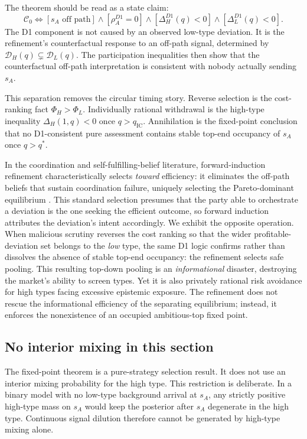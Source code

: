 The theorem should be read as a state claim:
\[
\mathcal C_0
\Longleftrightarrow
\left[
s_A\text{ off path}
\right]
\wedge
\left[
\rho_A^{D1}=0
\right]
\wedge
\left[
\Delta_H^{D1}(q)<0
\right]
\wedge
\left[
\Delta_L^{D1}(q)<0
\right].
\]
The D1 component is not caused by an observed low-type deviation. It is the refinement's counterfactual response to an off-path signal, determined by \(\mathcal D_H(q)\subsetneq\mathcal D_L(q)\). The participation inequalities then show that the counterfactual off-path interpretation is consistent with nobody actually sending \(s_A\).

This separation removes the circular timing story. Reverse selection is the cost-ranking fact \(\Phi_H>\Phi_L\). Individually rational withdrawal is the high-type inequality \(\Delta_H(1,q)<0\) once \(q>q_{\mathrm{IC}}\). Annihilation is the fixed-point conclusion that no D1-consistent pure assessment contains stable top-end occupancy of \(s_A\) once \(q>q^*\).

In the coordination and self-fulfilling-belief literature, forward-induction refinement characteristically selects \emph{toward} efficiency: it eliminates the off-path beliefs that sustain coordination failure, uniquely selecting the Pareto-dominant equilibrium \citep[e.g., the refinement resolutions of][]{diamond1983bank}. This standard selection presumes that the party able to orchestrate a deviation is the one seeking the efficient outcome, so forward induction attributes the deviation's intent accordingly. We exhibit the opposite operation. When malicious scrutiny reverses the cost ranking so that the wider profitable-deviation set belongs to the \emph{low} type, the same D1 logic confirms rather than dissolves the absence of stable top-end occupancy: the refinement selects safe pooling. This resulting top-down pooling is an \emph{informational} disaster, destroying the market's ability to screen types. Yet it is also privately rational risk avoidance for high types facing excessive epistemic exposure. The refinement does not rescue the informational efficiency of the separating equilibrium; instead, it enforces the nonexistence of an occupied ambitious-top fixed point.

\subsection{No interior mixing in this section}
\label{subsec:no-mixing-sec6}

The fixed-point theorem is a pure-strategy selection result. It does not use an interior mixing probability for the high type. This restriction is deliberate. In a binary model with no low-type background arrival at \(s_A\), any strictly positive high-type mass on \(s_A\) would keep the posterior after \(s_A\) degenerate in the high type. Continuous signal dilution therefore cannot be generated by high-type mixing alone.

